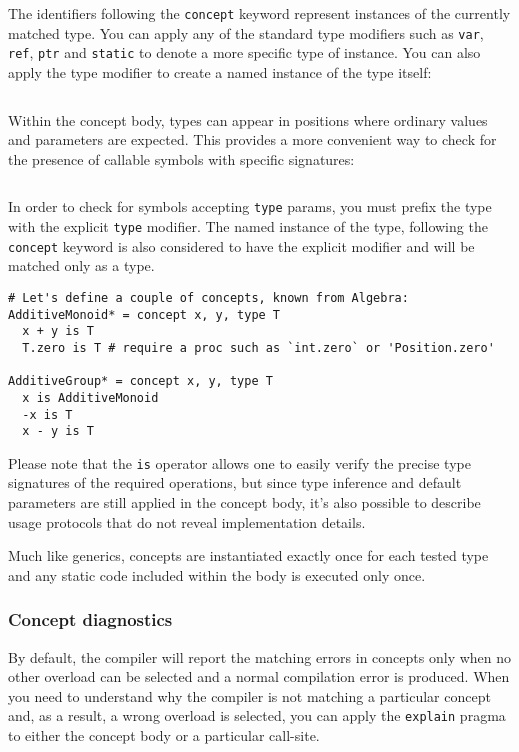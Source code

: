 The identifiers following the \texttt{concept} keyword represent
instances of the currently matched type. You can apply any of the
standard type modifiers such as \texttt{var}, \texttt{ref}, \texttt{ptr}
and \texttt{static} to denote a more specific type of instance. You can
also apply the {type} modifier to create a named instance of the type
itself:

\begin{verbatim}
\end{verbatim}

Within the concept body, types can appear in positions where ordinary
values and parameters are expected. This provides a more convenient way
to check for the presence of callable symbols with specific signatures:

\begin{verbatim}
\end{verbatim}

In order to check for symbols accepting \texttt{type} params, you must
prefix the type with the explicit \texttt{type} modifier. The named
instance of the type, following the \texttt{concept} keyword is also
considered to have the explicit modifier and will be matched only as a
type.

\begin{verbatim}
# Let's define a couple of concepts, known from Algebra:
AdditiveMonoid* = concept x, y, type T
  x + y is T
  T.zero is T # require a proc such as `int.zero` or 'Position.zero'

AdditiveGroup* = concept x, y, type T
  x is AdditiveMonoid
  -x is T
  x - y is T
\end{verbatim}

Please note that the \texttt{is} operator allows one to easily verify
the precise type signatures of the required operations, but since type
inference and default parameters are still applied in the concept body,
it's also possible to describe usage protocols that do not reveal
implementation details.

Much like generics, concepts are instantiated exactly once for each
tested type and any static code included within the body is executed
only once.

\hypertarget{concept-diagnostics}{%
\subsubsection{Concept diagnostics}\label{concept-diagnostics}}

By default, the compiler will report the matching errors in concepts
only when no other overload can be selected and a normal compilation
error is produced. When you need to understand why the compiler is not
matching a particular concept and, as a result, a wrong overload is
selected, you can apply the \texttt{explain} pragma to either the
concept body or a particular call-site.

